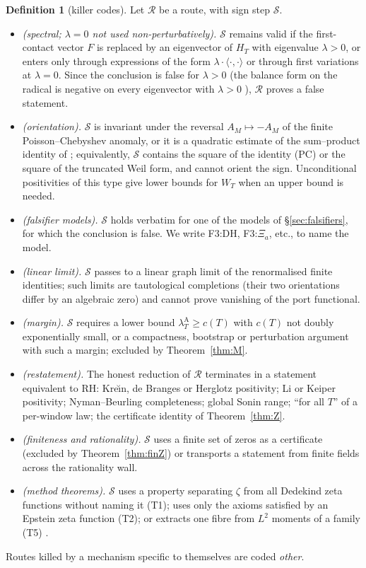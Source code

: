 \documentclass[11pt]{amsart}
\theoremstyle{definition}
\newtheorem{definition}[theorem]{Definition}
\theoremstyle{remark}
\newcommand{\lamA}{\lambda^{\mathrm A}_T}
\begin{document}
\begin{definition}[killer codes]\label{def:killers}
Let $\mathcal R$ be a route, with sign step $\mathcal S$.
\begin{itemize}
\item[\textbf{F1}] \emph{(spectral; $\lambda=0$ not used non-perturbatively).} $\mathcal S$ remains valid if
 the first-contact vector $F$ is replaced by an eigenvector of $H_T$ with eigenvalue $\lambda>0$, or
 enters only through expressions of the form $\lambda\cdot\langle\cdot,\cdot\rangle$ or through first
 variations at $\lambda=0$. Since the conclusion is false for $\lambda>0$ (the balance form on the
 radical is negative on every eigenvector with $\lambda>0$ \cite[\S17]{Paper47}),
 $\mathcal R$ proves a false statement.
\item[\textbf{F2}] \emph{(orientation).} $\mathcal S$ is invariant under the reversal $A_M\mapsto-A_M$ of the
 finite Poisson--Chebyshev anomaly, or it is a quadratic estimate of the sum--product identity of
 \cite[\S17]{Paper47}; equivalently, $\mathcal S$ contains the square of the
 identity (PC) or the square of the truncated Weil form, and cannot orient the sign.
 Unconditional positivities of this type give lower bounds for $W_T$ when an upper bound is needed.
\item[\textbf{F3}] \emph{(falsifier models).} $\mathcal S$ holds verbatim for one of the models of
 \S\ref{sec:falsifiers}, for which the conclusion is false. We write F3:DH, F3:$\Xi_a$, etc., to name the
 model.
\item[\textbf{F4}] \emph{(linear limit).} $\mathcal S$ passes to a linear graph limit of the renormalised
 finite identities; such limits are tautological completions (their two orientations differ by an
 algebraic zero) and cannot prove vanishing of the port functional.
\item[\textbf{M}] \emph{(margin).} $\mathcal S$ requires a lower bound $\lamA\ge c(T)$ with $c(T)$ not
 doubly exponentially small, or a compactness, bootstrap or perturbation argument with such a margin;
 excluded by Theorem~\ref{thm:M}.
\item[\textbf{E1}] \emph{(restatement).} The honest reduction of $\mathcal R$ terminates in a statement
 equivalent to RH: Kre\u{\i}n, de Branges or Herglotz positivity; Li or Keiper positivity; Nyman--Beurling
 completeness; global Sonin range; ``for all $T$'' of a per-window law; the certificate identity of
 Theorem~\ref{thm:Z}.
\item[\textbf{W8}] \emph{(finiteness and rationality).} $\mathcal S$ uses a finite set of zeros as a
 certificate (excluded by Theorem~\ref{thm:finZ}) or transports a statement from finite fields across
 the rationality wall.
\item[\textbf{T1/T2/T5}] \emph{(method theorems).} $\mathcal S$ uses a property separating $\zeta$ from
 all Dedekind zeta functions without naming it (T1); uses only the axioms satisfied by an Epstein zeta
 function (T2); or extracts one fibre from $L^2$ moments of a family (T5) \cite[\S\S18, 27]{Paper46}.
\end{itemize}
Routes killed by a mechanism specific to themselves are coded \emph{other}.
\end{definition}
\end{document}
